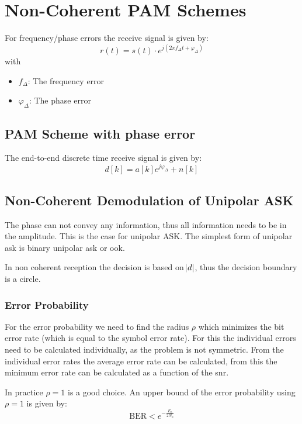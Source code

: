 \section{Non-Coherent PAM Schemes}
For frequency/phase errors the receive signal is given by:
\begin{equation}
    r(t) = s(t) \cdot e^{j (2 \pi f_\Delta t + \varphi_\Delta)}
\end{equation}
with
\begin{itemize}
    \item $f_\Delta$: The frequency error
    \item $\varphi_\Delta$: The phase error
\end{itemize}

\subsection{PAM Scheme with phase error}
The end-to-end discrete time receive signal is given by:
\begin{equation}
    d[k] = a[k] e^{j \varphi_\Delta} + n[k]
\end{equation}

\subsection{Non-Coherent Demodulation of Unipolar ASK}
The phase can not convey any information, thus all information needs to be in the
amplitude. This is the case for unipolar ASK. The simplest form of unipolar \ac{ask}
is binary unipolar \ac{ask} or \ac{ook}.

In non coherent reception the decision is based on $\abs{d}$, thus the decision
boundary is a circle.

\subsubsection{Error Probability}
For the error probability we need to find the radius $\rho$ which minimizes the
bit error rate (which is equal to the symbol error rate). For this the individual errors
need to be calculated individually, as the problem is not symmetric.
From the individual error rates the average error rate can be calculated, from
this the minimum error rate can be calculated as a function of the \ac{snr}.

In practice $\rho=1$ is a good choice. An upper bound of the error probability
using $\rho=1$ is given by:
\begin{equation}
    \text{BER} < e^{-\frac{E_b}{2 N_0}}
\end{equation}

